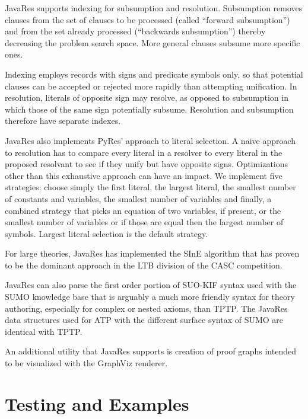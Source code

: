 \documentclass{llncs}
\begin{document}
JavaRes supports indexing for subsumption and resolution.  Subsumption
removes clauses from the set of clauses to be processed (called
``forward subsumption'') and from the set already processed (``backwards
subsumption'') thereby decreasing the problem search space.  More
general clauses subsume more specific ones.

Indexing employs
records with signs and predicate symbols only, so that potential clauses can
be accepted or rejected more rapidly than attempting unification.  In resolution, literals of opposite sign may resolve,
as opposed to subsumption in which those of the same sign potentially subsume.
Resolution and subsumption therefore have separate indexes.

JavaRes also implements PyRes' approach to literal selection.  A naive
approach to resolution has to compare every literal in a resolver to
every literal in the proposed resolvant to see if they unify but have
opposite signs.  Optimizations other than this exhaustive approach can
have an impact.  We implement five strategies: choose simply the first
literal, the largest literal, the smallest number of constants and
variables, the smallest number of variables and finally, a combined
strategy that picks an equation of two variables, if present, or the
smallest number of variables or if those are equal then the largest
number of symbols.  Largest literal selection is the default strategy.

For large theories, JavaRes has implemented the SInE
algorithm\cite{HV:CADE-2011} that has proven to be the dominant approach in the
LTB division of the CASC competition.

JavaRes can also parse the first order portion of SUO-KIF syntax used
with the SUMO knowledge base that is arguably a much more friendly
syntax for theory authoring, especially for complex or nested axioms,
than TPTP.  The JavaRes data structures used for ATP with the different surface
syntax of SUMO are identical with TPTP.

An additional utility that JavaRes supports is creation of proof
graphs intended to be visualized with the GraphViz renderer.

\section{Testing and Examples}
\end{document}
